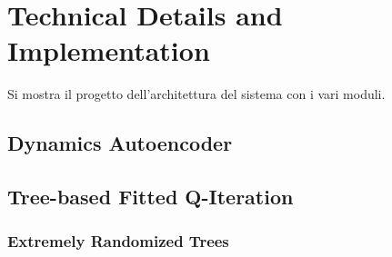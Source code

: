 \chapter{Technical Details and Implementation}
\label{ch5_arch}
\thispagestyle{empty}

\vspace{0.5cm}

\noindent Si mostra il progetto dell'architettura del sistema con i vari moduli.

\section{Dynamics Autoencoder}

\section{Tree-based Fitted Q-Iteration}
\subsection{Extremely Randomized Trees}



